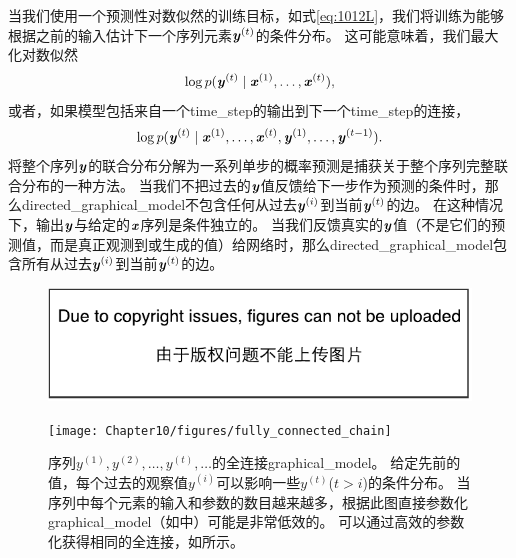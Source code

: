 当我们使用一个预测性对数似然的训练目标，如式\eqref{eq:1012L}，我们将训练为能够根据之前的输入估计下一个序列元素$\boldsymbol{\mathit{y}}^{(t)}$的条件分布。
这可能意味着，我们最大化对数似然
\begin{align}
 \log p(\boldsymbol{\mathit{y}}^{(t)} \mid \boldsymbol{\mathit{x}}^{(1)},\dots, \boldsymbol{\mathit{x}}^{(t)}),
\end{align}
或者，如果模型包括来自一个\gls{time_step}的输出到下一个\gls{time_step}的连接，
\begin{align}
 \log p(\boldsymbol{\mathit{y}}^{(t)} \mid \boldsymbol{\mathit{x}}^{(1)},\dots, \boldsymbol{\mathit{x}}^{(t)},\boldsymbol{\mathit{y}}^{(1)},\dots, \boldsymbol{\mathit{y}}^{(t-1)} ).
\end{align}
将整个序列$\boldsymbol{\mathit{y}}$的联合分布分解为一系列单步的概率预测是捕获关于整个序列完整联合分布的一种方法。
当我们不把过去的$\boldsymbol{\mathit{y}}$值反馈给下一步作为预测的条件时，那么\gls{directed_graphical_model}不包含任何从过去$\boldsymbol{\mathit{y}}^{(i)}$到当前$\boldsymbol{\mathit{y}}^{(t)}$的边。
在这种情况下，输出$\boldsymbol{\mathit{y}}$与给定的$\boldsymbol{\mathit{x}}$序列是条件独立的。
当我们反馈真实的$\boldsymbol{\mathit{y}}$值（不是它们的预测值，而是真正观测到或生成的值）给网络时，那么\gls{directed_graphical_model}包含所有从过去$\boldsymbol{\mathit{y}}^{(i)}$到当前$\boldsymbol{\mathit{y}}^{(t)}$的边。
\begin{figure}[!htb]
\ifOpenSource
\centerline{\includegraphics{figure.pdf}}
\else
\centerline{\texttt{[image: Chapter10/figures/fully\_connected\_chain]}}
\fi
\caption{序列$y^{(1)},y^{(2)},\dots,y^{(t)},\dots$的全连接\gls{graphical_model}。
给定先前的值，每个过去的观察值$y^{(i)}$可以影响一些$y^{(t)}$($t>i$)的条件分布。
当序列中每个元素的输入和参数的数目越来越多，根据此图直接参数化\gls{graphical_model}（如中）可能是非常低效的。
可以通过高效的参数化获得相同的全连接，如所示。
}
\label{fig:chap10_fully_connected_chain}
\end{figure}


